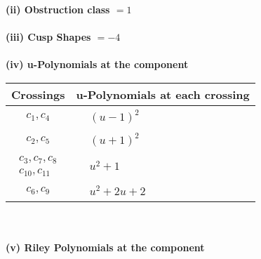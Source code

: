 \documentclass[1p]{elsarticle_modified}
\theoremstyle{definition}
\begin{document}
\flushleft \textbf{(ii) Obstruction class $= 1$}\\~\\
\flushleft \textbf{(iii) Cusp Shapes $= -4$}\\~\\
\newpage\renewcommand{\arraystretch}{1}
\flushleft \textbf{(iv) u-Polynomials at the component}\newline \\
\begin{tabular}{m{50pt}|m{274pt}}
Crossings & \hspace{64pt}u-Polynomials at each crossing \\
\hline $$\begin{aligned}c_{1},c_{4}\end{aligned}$$&$\begin{aligned}
&(u-1)^2
\end{aligned}$\\
\hline $$\begin{aligned}c_{2},c_{5}\end{aligned}$$&$\begin{aligned}
&(u+1)^2
\end{aligned}$\\
\hline $$\begin{aligned}c_{3},c_{7},c_{8}\\c_{10},c_{11}\end{aligned}$$&$\begin{aligned}
&u^2+1
\end{aligned}$\\
\hline $$\begin{aligned}c_{6},c_{9}\end{aligned}$$&$\begin{aligned}
&u^2+2 u+2
\end{aligned}$\\
\hline
\end{tabular}\\~\\
\newpage\renewcommand{\arraystretch}{1}
\flushleft \textbf{(v) Riley Polynomials at the component}\newline \\
\end{document}
